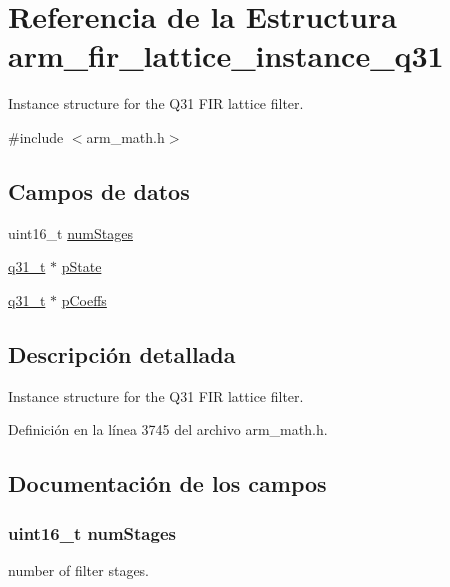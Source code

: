 \hypertarget{structarm__fir__lattice__instance__q31}{}\section{Referencia de la Estructura arm\+\_\+fir\+\_\+lattice\+\_\+instance\+\_\+q31}
\label{structarm__fir__lattice__instance__q31}


Instance structure for the Q31 F\+IR lattice filter.  




{\ttfamily \#include $<$arm\+\_\+math.\+h$>$}

\subsection*{Campos de datos}
\begin{DoxyCompactItemize}
\item 
uint16\+\_\+t \hyperlink{structarm__fir__lattice__instance__q31_a4cceb90547b3e585d4c7aabaa8057212}{num\+Stages}
\item 
\hyperlink{arm__math_8h_adc89a3547f5324b7b3b95adec3806bc0}{q31\+\_\+t} $\ast$ \hyperlink{structarm__fir__lattice__instance__q31_adee4ba3ee8869865af7d8fa08ca913d6}{p\+State}
\item 
\hyperlink{arm__math_8h_adc89a3547f5324b7b3b95adec3806bc0}{q31\+\_\+t} $\ast$ \hyperlink{structarm__fir__lattice__instance__q31_a68888e36167d81cb7836db10367a1682}{p\+Coeffs}
\end{DoxyCompactItemize}


\subsection{Descripción detallada}
Instance structure for the Q31 F\+IR lattice filter. 

Definición en la línea 3745 del archivo arm\+\_\+math.\+h.



\subsection{Documentación de los campos}
\subsubsection[{\texorpdfstring{num\+Stages}{numStages}}]{\setlength{\rightskip}{0pt plus 5cm}uint16\+\_\+t num\+Stages}\hypertarget{structarm__fir__lattice__instance__q31_a4cceb90547b3e585d4c7aabaa8057212}{}\label{structarm__fir__lattice__instance__q31_a4cceb90547b3e585d4c7aabaa8057212}
number of filter stages. 

